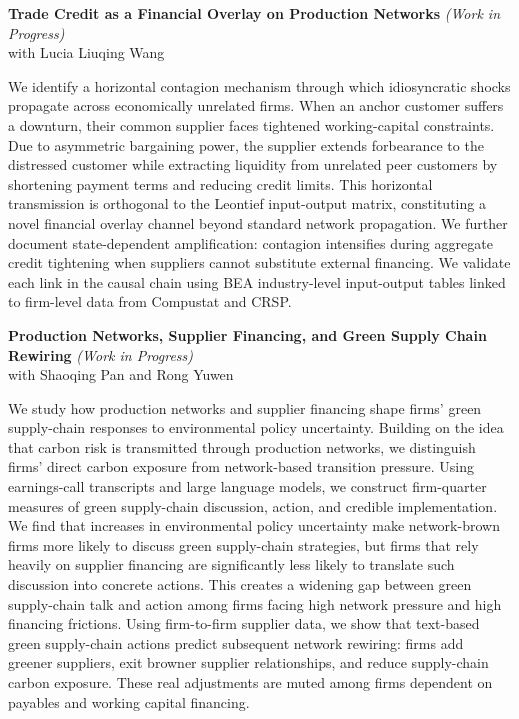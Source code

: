 \documentclass[12pt, letterpaper]{article}
\newenvironment{paperentry}{%
  \vspace{2pt}%
  \begin{list}{}{%
    \setlength{\leftmargin}{0pt}%
    \setlength{\topsep}{0pt}%
    \setlength{\itemsep}{0pt}%
    \setlength{\parsep}{3pt}%
  }\item%
}{%
  \end{list}\vspace{5pt}%
}
\newenvironment{paperabstract}{%
  \list{}{%
    \setlength{\leftmargin}{1.6em}%
    \setlength{\rightmargin}{1.6em}%
    \setlength{\topsep}{3pt}%
    \setlength{\parsep}{0pt}%
  }\item\relax\small%
}{%
  \endlist%
}
\begin{document}
\begin{paperentry}
  \textbf{Trade Credit as a Financial Overlay on Production Networks}
  \hfill{\small\itshape\color{muted}(Work in Progress)}\\[2pt]
  {\small with Lucia Liuqing Wang}
  \begin{paperabstract}
    We identify a horizontal contagion mechanism through which idiosyncratic shocks
    propagate across economically unrelated firms. When an anchor customer suffers a
    downturn, their common supplier faces tightened working-capital constraints. Due to
    asymmetric bargaining power, the supplier extends forbearance to the distressed
    customer while extracting liquidity from unrelated peer customers by shortening
    payment terms and reducing credit limits. This horizontal transmission is orthogonal
    to the Leontief input-output matrix, constituting a novel financial overlay channel
    beyond standard network propagation. We further document state-dependent
    amplification: contagion intensifies during aggregate credit tightening when
    suppliers cannot substitute external financing. We validate each link in the causal
    chain using BEA industry-level input-output tables linked to firm-level data from
    Compustat and CRSP.
  \end{paperabstract}
\end{paperentry}

\begin{paperentry}
  \textbf{Production Networks, Supplier Financing, and Green Supply Chain Rewiring}
  \hfill{\small\itshape\color{muted}(Work in Progress)}\\[2pt]
  {\small with Shaoqing Pan and Rong Yuwen}
  \begin{paperabstract}
    We study how production networks and supplier financing shape firms' green
    supply-chain responses to environmental policy uncertainty. Building on the idea
    that carbon risk is transmitted through production networks, we distinguish firms'
    direct carbon exposure from network-based transition pressure. Using earnings-call
    transcripts and large language models, we construct firm-quarter measures of green
    supply-chain discussion, action, and credible implementation. We find that increases
    in environmental policy uncertainty make network-brown firms more likely to discuss
    green supply-chain strategies, but firms that rely heavily on supplier financing are
    significantly less likely to translate such discussion into concrete actions. This
    creates a widening gap between green supply-chain talk and action among firms facing
    high network pressure and high financing frictions. Using firm-to-firm supplier data,
    we show that text-based green supply-chain actions predict subsequent network
    rewiring: firms add greener suppliers, exit browner supplier relationships, and
    reduce supply-chain carbon exposure. These real adjustments are muted among firms
    dependent on payables and working capital financing.
  \end{paperabstract}
\end{paperentry}
\end{document}

